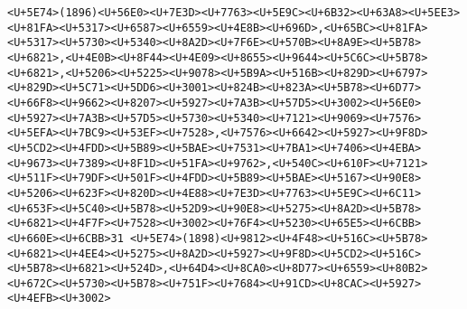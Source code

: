 \documentclass[
]{article}
\begin{document}
\begin{verbatim}
<U+5E74>(1896)<U+56E0><U+7E3D><U+7763><U+5E9C><U+6B32><U+63A8><U+5EE3><U+81FA><U+5317><U+6587><U+6559><U+4E8B><U+696D>,<U+65BC><U+81FA><U+5317><U+5730><U+5340><U+8A2D><U+7F6E><U+570B><U+8A9E><U+5B78><U+6821>,<U+4E0B><U+8F44><U+4E09><U+8655><U+9644><U+5C6C><U+5B78><U+6821>,<U+5206><U+5225><U+9078><U+5B9A><U+516B><U+829D><U+6797><U+829D><U+5C71><U+5DD6><U+3001><U+824B><U+823A><U+5B78><U+6D77><U+66F8><U+9662><U+8207><U+5927><U+7A3B><U+57D5><U+3002><U+56E0><U+5927><U+7A3B><U+57D5><U+5730><U+5340><U+7121><U+9069><U+7576><U+5EFA><U+7BC9><U+53EF><U+7528>,<U+7576><U+6642><U+5927><U+9F8D><U+5CD2><U+4FDD><U+5B89><U+5BAE><U+7531><U+7BA1><U+7406><U+4EBA><U+9673><U+7389><U+8F1D><U+51FA><U+9762>,<U+540C><U+610F><U+7121><U+511F><U+79DF><U+501F><U+4FDD><U+5B89><U+5BAE><U+5167><U+90E8><U+5206><U+623F><U+820D><U+4E88><U+7E3D><U+7763><U+5E9C><U+6C11><U+653F><U+5C40><U+5B78><U+52D9><U+90E8><U+5275><U+8A2D><U+5B78><U+6821><U+4F7F><U+7528><U+3002><U+76F4><U+5230><U+65E5><U+6CBB><U+660E><U+6CBB>31 <U+5E74>(1898)<U+9812><U+4F48><U+516C><U+5B78><U+6821><U+4EE4><U+5275><U+8A2D><U+5927><U+9F8D><U+5CD2><U+516C><U+5B78><U+6821><U+524D>,<U+64D4><U+8CA0><U+8D77><U+6559><U+80B2><U+672C><U+5730><U+5B78><U+751F><U+7684><U+91CD><U+8CAC><U+5927><U+4EFB><U+3002>

\end{verbatim}
\end{document}
